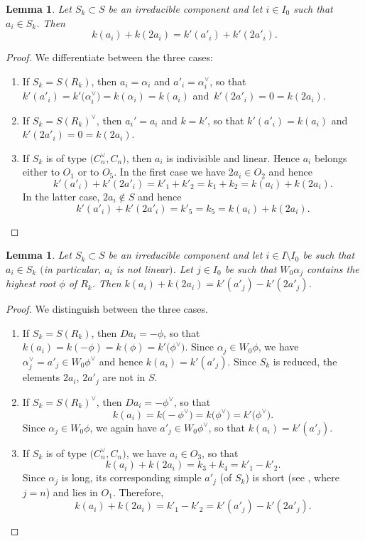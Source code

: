 \documentclass[pdftex]{sigma}
\newtheorem{Lemma}[Theorem]{Lemma}
\theoremstyle{definition}
\numberwithin{equation}{section}
\begin{document}
\begin{Lemma}\label{sec:lem-ks1}
 Let $S_k\subset S$ be an irreducible component and let $i\in I_0$ such that $a_i\in S_k$.
 Then
 \[
 k(a_i) + k(2a_i) = k'(a'_i) + k'(2a'_i).
 \]
\end{Lemma}
\begin{proof}
 We differentiate between the three cases:
 \begin{enumerate}\itemsep=0pt
 \item If $S_k=S(R_k)$, then $a_i=\alpha_i$ and $a'_i=\alpha_i^\vee$,
 so that
$
 k'(a'_i)=k'\bigl(\alpha_i^\vee\bigr)=k(\alpha_i)=k(a_i)
$
 and~${k'(2a'_i)=0=k(2a_i)}$.
 \item If $S_k=S(R_k)^\vee$, then $a_i'=a_i$ and $k=k'$, so that
 $k'(a'_i)=k(a_i)$ and $k'(2a'_i)=0=k(2a_i)$.
 \item If $S_k$ is of type $\bigl(C_n^\vee, C_n\bigr)$,
 then $a_i$ is indivisible and linear. Hence $a_i$ belongs either to
 $O_1$ or to $O_5$. In the first case we have $2a_i\in O_2$ and hence
 \[
 k'(a'_i) + k'(2a'_i)
 = k'_1 + k'_2 = k_1 + k_2
 = k(a_i) + k(2a_i).
 \]
 In the latter case, $2a_i\not\in S$ and hence
 \[
 k'(a'_i) + k'(2a'_i) = k'_5 = k_5 = k(a_i) + k(2a_i).\tag*{\qed}
 \]
 \end{enumerate}\renewcommand{\qed}{}
\end{proof}

\begin{Lemma}\label{sec:lem-ks2}
 Let $S_k\subset S$ be an irreducible component and let $i\in I\setminus I_0$ be such that $a_i\in S_k$ $($in particular, $a_i$ is not linear$)$.
 Let $j\in I_0$ be such that $W_0\alpha_j$ contains the highest root
 $\phi$ of $R_k$. Then
$
 k(a_i)+k(2a_i) = k'(a'_j) - k'(2a'_j)$.
\end{Lemma}
\begin{proof}
 We distinguish between the three cases.
 \begin{enumerate}\itemsep=0pt
 \item If $S_k=S(R_k)$, then $Da_i=-\phi$, so that
$
 k(a_i)=k(-\phi) = k(\phi) = k'\bigl(\phi^\vee\bigr)$.
 Since $\alpha_j\in W_0\phi$, we have $\alpha_j^\vee=a'_j\in W_0\phi^\vee$ and hence $k(a_i)=k'(a'_j)$. Since $S_k$ is reduced,
 the elements $2a_i$, $2a'_j$ are not in $S$.
 \item If $S_k=S(R_k)^\vee$, then $Da_i=-\phi^\vee$, so that
 \[
 k(a_i) = k\bigl(-\phi^\vee\bigr)=k\bigl(\phi^\vee\bigr)=
 k'\bigl(\phi^\vee\bigr).
 \]
 Since $\alpha_j\in W_0\phi$, we again have $a'_j\in W_0\phi^\vee$, so that $k(a_i)=k'(a'_j)$.
 \item If $S_k$ is of type $\bigl(C_n^\vee, C_n\bigr)$,
 we have $a_i\in O_3$, so that
 \[
 k(a_i)+k(2a_i)=k_3+k_4 = k'_1-k'_2.
 \]
 Since $\alpha_j$ is long, its corresponding simple $a'_j$ (of $S_k$) is short (see \cite[Section~1.4.3]{macdonald}, where~${j=n}$)
 and lies in $O_1$.
 Therefore,
 \[
 k(a_i)+k(2a_i) = k'_1-k'_2 = k'(a'_j)-k'(2a'_j).\tag*{\qed}
 \]
 \end{enumerate}\renewcommand{\qed}{}
\end{proof}
\end{document}
